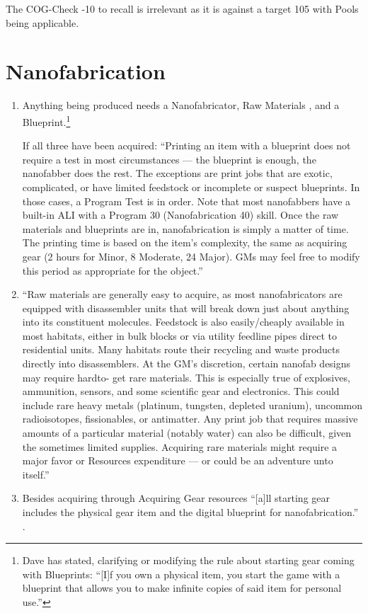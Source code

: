 The COG-Check -10 to recall is irrelevant as it is against a target 105 with Pools being applicable.


\section{Nanofabrication}

\begin{enumerate}
    \item Anything being produced needs a \gls{Nanofabricator}, Raw Materials \citep[p. 314]{ep2e_1.1_2019}, and a \gls{Blueprint}.\footnote{Dave has stated, clarifying or modifying the rule about starting gear coming with \glspl{Blueprint}: “[I]f you own a physical item, you start the game with a blueprint that allows you to make infinite copies of said item for personal use.”}

    If all three have been acquired: “Printing an item with a blueprint does not require a test in most circumstances — the blueprint is enough, the nanofabber does the rest. The exceptions are print jobs that are exotic, complicated, or have limited feedstock or incomplete or suspect blueprints. In those cases, a Program Test is in order. Note that most nanofabbers have a built-in ALI with a Program 30 (Nanofabrication 40) skill. Once the raw materials and blueprints are in, nanofabrication is simply a matter of time. The printing time is based on the item’s complexity, the same as acquiring gear (2 hours for Minor, 8 Moderate, 24 Major). GMs may feel free to modify this period as appropriate for the object.” \citep[pg. 314]{ep2e_1.1_2019}

    \item “Raw materials are generally easy to acquire, as most nanofabricators are equipped with disassembler units that will break down just about anything into its constituent molecules. Feedstock is also easily/cheaply available in most habitats, either in bulk blocks or via utility feedline pipes direct to residential units. Many habitats route their recycling and waste products directly into disassemblers. At the GM’s discretion, certain nanofab designs may require hardto- get rare materials. This is especially true of explosives, ammunition, sensors, and some scientific gear and electronics. This could include rare heavy metals (platinum, tungsten, depleted uranium), uncommon radioisotopes, fissionables, or antimatter. Any print job that requires massive amounts of a particular material (notably water) can also be difficult, given the sometimes limited supplies. Acquiring rare materials might require a major favor or Resources expenditure — or could be an adventure unto itself.” \citep[pg. 314]{ep2e_1.1_2019}
    \item Besides acquiring  through Acquiring Gear resources “[a]ll starting gear includes the physical gear item and the digital blueprint for nanofabrication.” \citep[pg. 68]{ep2e_1.1_2019}.


\end{enumerate}
